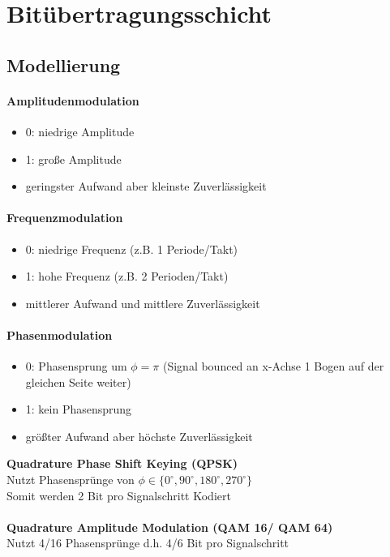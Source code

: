 \documentclass[12pt,a4paper]{article}
\begin{document}
\section{Bitübertragungsschicht}
\subsection{Modellierung}
\paragraph{Amplitudenmodulation}
\begin{itemize}
\item 0: niedrige Amplitude
\item 1: große Amplitude
\item geringster Aufwand aber kleinste Zuverlässigkeit 
\end{itemize}
\paragraph{Frequenzmodulation}
\begin{itemize}
\item 0: niedrige Frequenz (z.B. 1 Periode/Takt)
\item 1: hohe Frequenz	(z.B. 2 Perioden/Takt)
\item mittlerer Aufwand und mittlere Zuverlässigkeit
\end{itemize}
\paragraph{Phasenmodulation}
\begin{itemize}
\item 0: Phasensprung um $\phi=\pi$	(Signal bounced an x-Achse 1 Bogen auf der gleichen Seite weiter)
\item 1: kein Phasensprung
\item größter Aufwand aber höchste Zuverlässigkeit
\end{itemize}
\textbf{Quadrature Phase Shift Keying (QPSK)}\\
Nutzt Phasensprünge von $\phi \in \{ 0^\circ, 90^\circ ,180^\circ ,270^\circ\}$\\
Somit werden 2 Bit pro Signalschritt Kodiert\\
\\
\textbf{Quadrature Amplitude Modulation (QAM 16/ QAM 64)}\\
Nutzt 4/16 Phasensprünge d.h. 4/6 Bit pro Signalschritt\\
\end{document}
